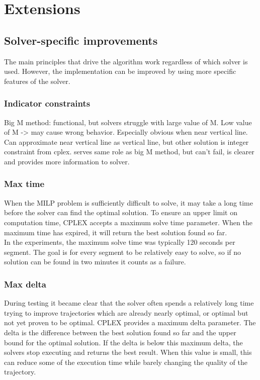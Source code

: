 \section{Extensions}
\label{section:extensions}

\subsection{Solver-specific improvements}
The main principles that drive the algorithm work regardless of which solver is used. However, the implementation can be improved by using more specific features of the solver.

\subsubsection{Indicator constraints}
Big M method: functional, but solvers struggle with large value of M. Low value of M -> may cause wrong behavior. Especially obvious when near vertical line. \\
Can approximate near vertical line as vertical line, but other solution is integer constraint from cplex. serves same role as big M method, but can't fail, is clearer and provides more information to solver.

\subsubsection{Max time}
When the MILP problem is sufficiently difficult to solve, it may take a long time before the solver can find the optimal solution. To ensure an upper limit on computation time, CPLEX accepts a maximum solve time parameter. When the maximum time has expired, it will return the best solution found so far.\\
In the experiments, the maximum solve time was typically 120 seconds per segment. The goal is for every segment to be relatively easy to solve, so if no solution can be found in two minutes it counts as a failure.
\subsubsection{Max delta}
During testing it became clear that the solver often spends a relatively long time trying to improve trajectories which are already nearly optimal, or optimal but not yet proven to be optimal. CPLEX provides a maximum delta parameter. The delta is the difference between the best solution found so far and the upper bound for the optimal solution. If the delta is below this maximum delta, the solvers stop executing and returns the best result. When this value is small, this can reduce some of the execution time while barely changing the quality of the trajectory.

